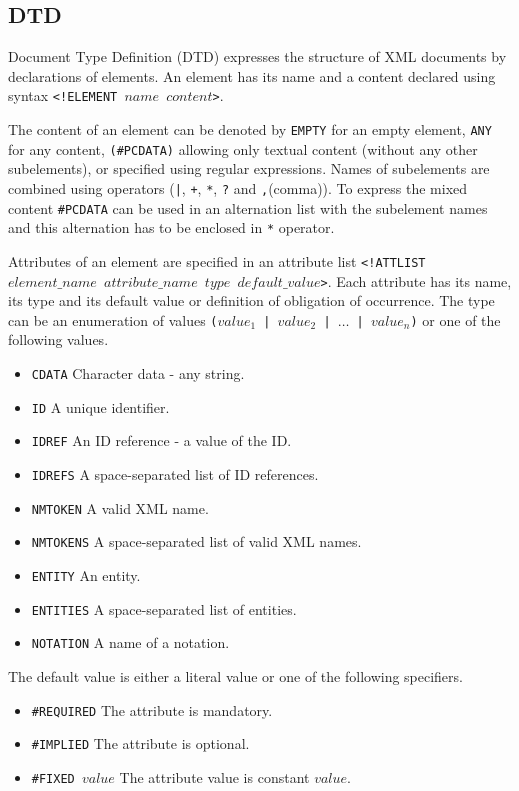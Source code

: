 \subsection{DTD}
Document Type Definition (DTD) expresses the structure of XML documents by declarations of elements. An element has its name and a content declared using syntax \texttt{<!ELEMENT $name$ $content$>}.

The content of an element can be denoted by \texttt{EMPTY} for an empty element, \texttt{ANY} for any content, \texttt{(\#PCDATA)} allowing only textual content (without any other subelements), or specified using regular expressions. Names of subelements are combined using operators (\texttt{|}, \texttt{+}, \texttt{*}, \texttt{?} and \texttt{,}(comma)). To express the mixed content \texttt{\#PCDATA} can be used in an alternation list with the subelement names and this alternation has to be enclosed in \texttt{*} operator.

Attributes of an element are specified in an attribute list \texttt{<!ATTLIST\linebreak $element\_name$ $attribute\_name$ $type$ $default\_value$>}. Each attribute has its name, its type and its default value or definition of obligation of occurrence. The type can be an enumeration of values \texttt{($value_1$ | $value_2$ | $\dots$ | $value_n$)} or one of the following values.

\begin{itemize}
\item \texttt{CDATA} Character data - any string.
\item \texttt{ID} A unique identifier.
\item \texttt{IDREF} An ID reference - a value of the ID.
\item \texttt{IDREFS} A space-separated list of ID references. 
\item \texttt{NMTOKEN}	A valid XML name.
\item \texttt{NMTOKENS} A space-separated list of valid XML names.
\item \texttt{ENTITY} An entity.
\item \texttt{ENTITIES} A space-separated list of entities.
\item \texttt{NOTATION} A name of a notation.
\end{itemize}

The default value is either a literal value or one of the following specifiers.

\begin{itemize}
\item \texttt{\#REQUIRED} The attribute is mandatory.
\item \texttt{\#IMPLIED} The attribute is optional.
\item \texttt{\#FIXED $value$} The attribute value is constant $value$.
\end{itemize}

